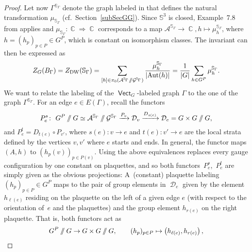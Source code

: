 \documentclass[10pt,a4paper]{amsart}
\DeclareMathOperator{\Aut}{Aut}
\DeclareMathOperator{\vect}{\mathsf{Vect}}
\DeclareMathOperator{\C}{\mathbb{C}}
\DeclareMathOperator{\cald}{\mathcal{D}}
\newcommand{\sslash}{\mathbin{/\mkern-6mu/}}
\numberwithin{equation}{section}
\theoremstyle{definition}
\begin{document}
\begin{proof}
Let now $\Gamma^{\mathbb{S}_{\Gamma}}$ denote the graph labeled in \smash{$\vect_{\C}^{\mathcal{A}^{\mathbb{S}_{\Gamma}} \sslash \mathcal{G}^{\mathbb{S}_{\Gamma}}}$} that defines the natural transformation $\mu_{\mathbb{S}_{\Gamma}}$ (cf.\ Section~\ref{subSecGG}). Since $\mathbb{S}^3$ is closed, Example~7.8 from \cite{FMM} applies and $\mu_{\mathbb{S}_{\Gamma}}\colon \C \Rightarrow \C$ corresponds to a map $\mathcal{A}^{\mathbb{S}_{\Gamma}} \rightarrow \C, h \mapsto \mu_h^{\mathbb{S}_{\Gamma}}$, where $h = (h_p)_{p \in P} \in G^{P}$, which is constant on isomorphism classes. The invariant can then be expressed as
\begin{align}
 \label{eqBallInv}
 Z_G(B_{\Gamma}) = Z_{\rm DW}(\mathbb{S}_{\Gamma}) = \sum_{[h] \in \pi_0(\mathcal{A}^{\mathbb{S}_{\Gamma}} \sslash \mathcal{G}^{\mathbb{S}_{\Gamma}})}\frac{\mu_h^{\mathbb{S}_{\Gamma}}}{|{\Aut(h)}|} = \frac{1}{|G|}\sum_{h \in G^P} \mu_h^{\mathbb{S}_{\Gamma}}.
\end{align}
We want to relate the labeling of the $\vect_{G}$-labeled graph $\Gamma$ to the one of the graph $\Gamma^{\mathbb{S}_{\Gamma}}$. For an edge $e \in E(\Gamma)$, recall the functors
\begin{align*}
 P_e^s \colon \ G^P\sslash G \simeq \mathcal{A}^{\mathbb{S}_{\Gamma}} \sslash \mathcal{G}^{\mathbb{S}_{\Gamma}} \xrightarrow{P_v} \mathcal{D}_v \xrightarrow{D_{s(e)}} \mathcal{D}_e = G \times G \sslash G,
\end{align*}
and $P_e^t = D_{t(e)} \circ P_{v'}$, where $s(e)\colon v \rightarrow e$ and $t(e)\colon v' \rightarrow e$ are the local strata defined by the vertices $v, v'$ where $e$ starts and ends. In general, the functor \smash{$P_v\colon \mathcal{A}^{\mathbb{S}_{\Gamma}} \sslash \mathcal{G}^{\mathbb{S}_{\Gamma}} \rightarrow \cald_v$} maps $(A, h)$ to $(h_p(v))_{p \in P(v)}$. Using the above equivalences replaces every gauge configuration by one constant on plaquettes, and so both functors~$P_e^s$,~$P_e^t$ are simply given as the obvious projections: A~(constant) plaquette labeling $(h_p)_{p \in P} \in G^P$ maps to the pair of group elements in $\cald_e$ given by the element $h_{\ell(e)}$ residing on the plaquette on the left of a given edge $e$ (with respect to the orientation of~$e$ and the plaquettes) and the group element $h_{r(e)}$ on the right plaquette. That is, both functors act as
\begin{align*}
 G^P \sslash G \rightarrow G \times G \sslash G, \qquad (h_p)_{p \in P} \mapsto \left(h_{\ell(e)}, h_{r(e)}\right),
\end{align*}

\end{proof}
\end{document}
